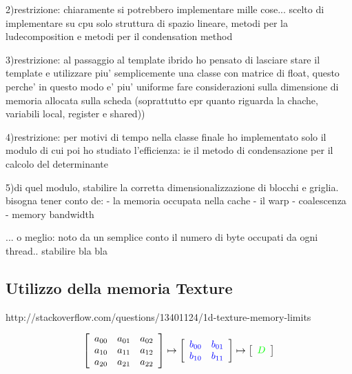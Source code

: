 \documentclass{article}
\begin{document}
2)restrizione: chiaramente si potrebbero implementare mille cose... scelto di implementare su cpu solo struttura di spazio lineare, metodi per la ludecomposition e metodi per il condensation method

3)restrizione: al passaggio al template ibrido ho pensato di lasciare stare il template e utilizzare piu' semplicemente una classe con matrice di float, questo perche' in questo modo e' piu' uniforme fare considerazioni sulla dimensione di memoria allocata sulla scheda (soprattutto epr quanto riguarda la chache, variabili local, register e shared))

4)restrizione: per motivi di tempo nella classe finale ho implementato solo il modulo di cui poi ho studiato l'efficienza: ie il metodo di condensazione per il calcolo del determinante

5)di quel modulo, stabilire la corretta dimensionalizzazione di blocchi e griglia. bisogna tener conto de: - la memoria occupata nella cache
                                                                                                           - il warp
                                                                                                           - coalescenza
                                                                                                           - memory bandwidth

    ... o meglio: noto da un semplice conto il numero di byte occupati da ogni thread.. stabilire bla bla

\subsection{Utilizzo della memoria Texture}
http://stackoverflow.com/questions/13401124/1d-texture-memory-limits

\begin{displaymath}
\left[ \begin{array}{ccc} a_{00} & a_{01} & a_{02} \\ a_{10} & a_{11} & a_{12} \\ a_{20} & a_{21} & a_{22}  \end{array} \right] 
\mapsto
\left[ \begin{array}{cc} \color{blue}b_{00} & \color{blue}b_{01} \\ \color{blue}b_{10} & \color{blue}b_{11}  \end{array} \right] 
\mapsto
\left[ \begin{array}{c} \color{green}D   \end{array} \right] 
\end{displaymath}
\end{document}
